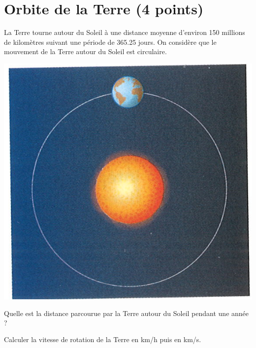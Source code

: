 \section{Orbite de la Terre (4 points)}

La Terre tourne autour du Soleil à une distance moyenne d'environ 150 millions de kilomètres suivant une période de \num{365.25} jours. On considère que le mouvement de la Terre autour du Soleil est circulaire.

\begin{center}
	\includegraphics[scale=0.5]{terre}
\end{center}

\begin{questions}
	\question[2] Quelle est la distance parcourue par la Terre autour du Soleil pendant une année ?
	\fillwithdottedlines{3cm}
	
	\question[2] Calculer la vitesse de rotation de la Terre en km/h puis en km/s.
	\fillwithdottedlines{3cm}
\end{questions}